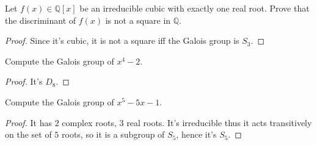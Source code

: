 \documentclass[openany]{book}
\begin{document}
\begin{prob}
Let \( f(x) \in \mathbb{Q}[x] \) be an irreducible cubic with exactly one real root. Prove that the discriminant of \( f(x) \) is not a square in \( \mathbb{Q} \).
\end{prob}
\begin{proof}
    Since it's cubic, it is not a square iff the Galois group is $S_3$.
\end{proof}



\begin{prob}
Compute the Galois group of \( x^4 - 2 \).
\end{prob}
\begin{proof}
    It's $D_8$.
\end{proof}



\begin{prob}
    Compute the Galois group of  \( x^5 - 5x - 1 \). 
\end{prob}
\begin{proof}
    It has $2$ complex roots, $3$ real roots. It's irreducible thus it acts transitively on the set of $5$ roots, so it is a subgroup of $S_5$, hence it's $S_5$.


\end{proof}

    
\end{document}
